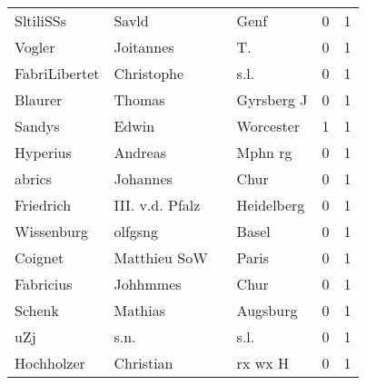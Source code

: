 \documentclass[10pt,a4paper,landscape]{article}
\begin{document}
\begin{longtable}{llllrr}
                SltiliSSs &                              Savld &             &                                        Genf &          0 &         1 \\
                   Vogler &                          Joitannes &             &                                         T.  &          0 &         1 \\
            FabriLibertet &                         Christophe &             &                                        s.l. &          0 &         1 \\
                  Blaurer &                             Thomas &             &                                  Gyrsberg J &          0 &         1 \\
                   Sandys &                              Edwin &             &                                   Worcester &          1 &         1 \\
                 Hyperius &                            Andreas &             &                                     Mphn rg &          0 &         1 \\
                   abrics &                           Johannes &             &                                        Chur &          0 &         1 \\
                Friedrich &                    III. v.d. Pfalz &             &                                  Heidelberg &          0 &         1 \\
               Wissenburg &                            olfgsng &             &                                       Basel &          0 &         1 \\
                  Coignet &                       Matthieu SoW &             &                                       Paris &          0 &         1 \\
                Fabricius &                           Johhmmes &             &                                        Chur &          0 &         1 \\
                   Schenk &                            Mathias &             &                                    Augsburg &          0 &         1 \\
                      uZj &                               s.n. &             &                                        s.l. &          0 &         1 \\
               Hochholzer &                          Christian &             &                                     rx wx H &          0 &         1 \\

\end{longtable}
\end{document}
